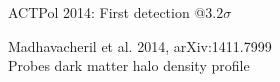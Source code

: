 \documentclass[table]{beamer}
\begin{document}
\begin{frame}{ACTPol 2014: First detection @$3.2\sigma$}
	\centering
	\hspace*{-1.2cm}
	Madhavacheril et al. 2014, arXiv:1411.7999 \\
	Probes dark matter halo density profile
\end{frame}
\end{document}
